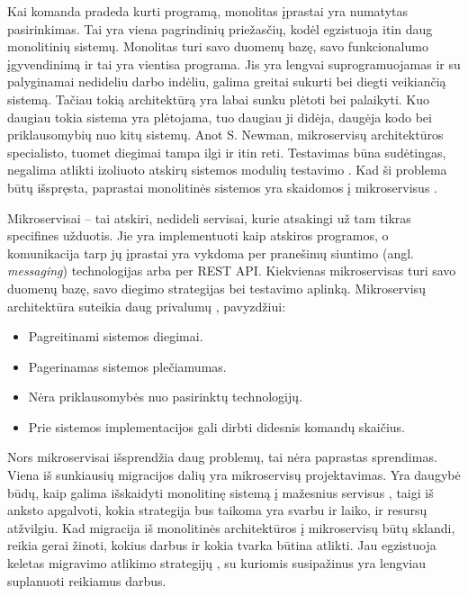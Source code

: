 \documentclass{VUMIFPSbakalaurinis}
\begin{document}
\tableofcontents

Kai komanda pradeda kurti programą, monolitas įprastai yra numatytas pasirinkimas. Tai yra viena pagrindinių priežasčių, kodėl egzistuoja itin daug monolitinių sistemų. Monolitas turi savo duomenų bazę, savo funkcionalumo įgyvendinimą ir tai yra vientisa programa. Jis yra lengvai suprogramuojamas ir su palyginamai nedideliu darbo indėliu, galima greitai sukurti bei diegti veikiančią sistemą. Tačiau tokią architektūrą yra labai sunku plėtoti bei palaikyti. Kuo daugiau  tokia sistema yra plėtojama, tuo daugiau ji didėja, daugėja kodo bei priklausomybių nuo kitų sistemų. Anot S. Newman, mikroservisų architektūros specialisto, tuomet diegimai tampa ilgi ir itin reti. Testavimas būna sudėtingas, negalima atlikti izoliuoto atskirų sistemos modulių testavimo \cite{New19}. Kad ši problema būtų išspręsta, paprastai monolitinės sistemos yra skaidomos į mikroservisus \cite{DK}.

Mikroservisai – tai atskiri, nedideli servisai, kurie atsakingi už tam tikras specifines užduotis. Jie yra implementuoti kaip atskiros programos, o komunikacija tarp jų įprastai yra vykdoma per pranešimų siuntimo (angl. \emph{messaging}) technologijas arba per REST API. Kiekvienas mikroservisas turi savo duomenų bazę, savo diegimo strategijas bei testavimo aplinką. Mikroservisų architektūra suteikia daug privalumų \cite{FBZ+19}, pavyzdžiui:
\begin{itemize}
    \item Pagreitinami sistemos diegimai.
    \item Pagerinamas sistemos plečiamumas.
    \item Nėra priklausomybės nuo pasirinktų technologijų.
    \item Prie sistemos implementacijos gali dirbti didesnis komandų skaičius.
\end{itemize}

Nors mikroservisai išsprendžia daug problemų, tai nėra paprastas sprendimas. Viena iš sunkiausių migracijos dalių yra mikroservisų projektavimas. Yra daugybė būdų, kaip galima išskaidyti monolitinę sistemą į mažesnius servisus \cite{FBZ+19}, taigi iš anksto apgalvoti, kokia strategija bus taikoma yra svarbu ir laiko, ir resursų atžvilgiu. Kad migracija iš monolitinės architektūros į mikroservisų būtų sklandi, reikia gerai žinoti, kokius darbus ir kokia tvarka būtina atlikti. Jau egzistuoja keletas migravimo atlikimo strategijų \cite{Wal22,MQO18,KXL+20}, su kuriomis susipažinus yra lengviau suplanuoti reikiamus darbus. 
\end{document}
